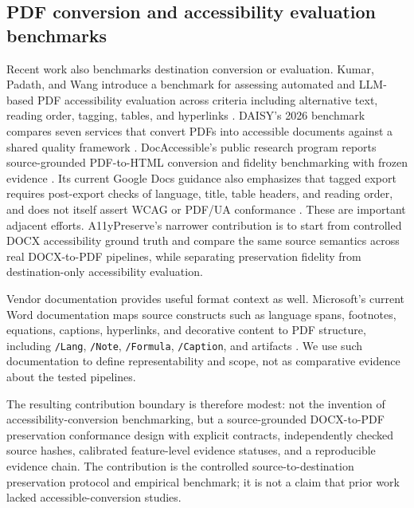 \subsection{PDF conversion and accessibility evaluation benchmarks}

Recent work also benchmarks destination conversion or evaluation. Kumar, Padath, and Wang introduce a benchmark for assessing automated and LLM-based PDF accessibility evaluation across criteria including alternative text, reading order, tagging, tables, and hyperlinks \cite{kumar2025}. DAISY's 2026 benchmark compares seven services that convert PDFs into accessible documents against a shared quality framework \cite{daisy2026}. DocAccessible's public research program reports source-grounded PDF-to-HTML conversion and fidelity benchmarking with frozen evidence \cite{docaccessible2026}. Its current Google Docs guidance also emphasizes that tagged export requires post-export checks of language, title, table headers, and reading order, and does not itself assert WCAG or PDF/UA conformance \cite{docaccessible-google}. These are important adjacent efforts. A11yPreserve's narrower contribution is to start from controlled DOCX accessibility ground truth and compare the same source semantics across real DOCX-to-PDF pipelines, while separating preservation fidelity from destination-only accessibility evaluation.

Vendor documentation provides useful format context as well. Microsoft's current Word documentation maps source constructs such as language spans, footnotes, equations, captions, hyperlinks, and decorative content to PDF structure, including \texttt{/Lang}, \texttt{/Note}, \texttt{/Formula}, \texttt{/Caption}, and artifacts \cite{microsoft-word-pdf}. We use such documentation to define representability and scope, not as comparative evidence about the tested pipelines.

The resulting contribution boundary is therefore modest: not the invention of accessibility-conversion benchmarking, but a source-grounded DOCX-to-PDF preservation conformance design with explicit contracts, independently checked source hashes, calibrated feature-level evidence statuses, and a reproducible evidence chain. The contribution is the controlled source-to-destination preservation protocol and empirical benchmark; it is not a claim that prior work lacked accessible-conversion studies.


